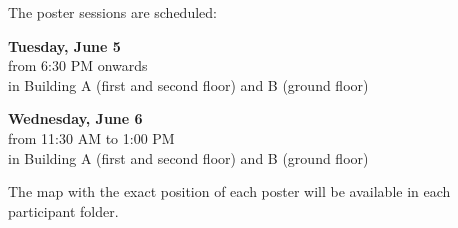 \begin{center}
  The poster sessions are scheduled:

  \smallskip

  \textbf{Tuesday, June 5} \\
  from 6:30 PM onwards \\
  in Building A (first and second floor) and B (ground floor)

  \smallskip

  \textbf{Wednesday, June 6}\\
  from 11:30 AM to 1:00 PM\\
  in Building A (first and second floor) and B (ground floor)

\smallskip
The map with the exact position of each poster will be available in each participant folder.

\end{center}

\bigskip


